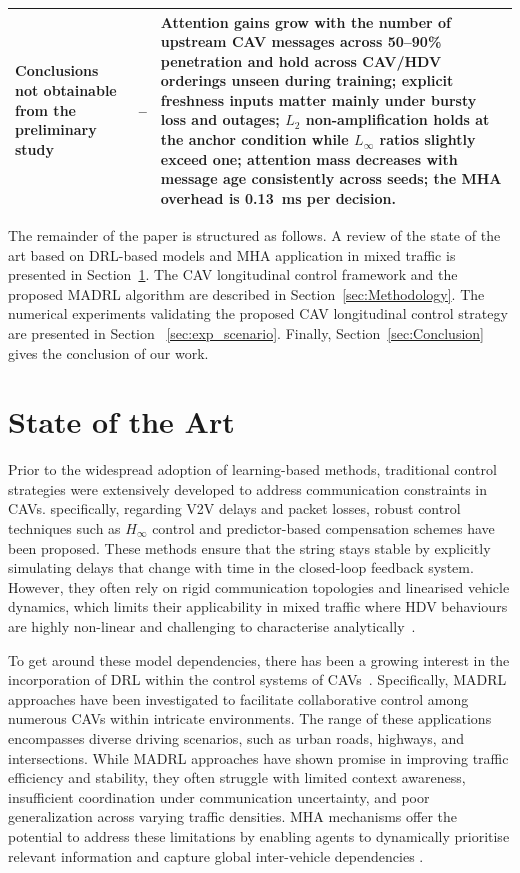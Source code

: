 \documentclass{ieeeaccess}
\begin{document}
\begin{table}[htbp]
\begin{tabularx}{\textwidth}{|p{3.1cm}|X|X|}
\rowcolor{yellow}Conclusions not obtainable from the preliminary study & -- & Attention gains grow with the number of upstream CAV messages across 50--90\% penetration and hold across CAV/HDV orderings unseen during training; explicit freshness inputs matter mainly under bursty loss and outages; $L_2$ non-amplification holds at the anchor condition while $L_\infty$ ratios slightly exceed one; attention mass decreases with message age consistently across seeds; the MHA overhead is 0.13~ms per decision. \\ \hline %
\end{tabularx}
\end{table}



The remainder of the paper is structured as follows. A review of the state of the art based on DRL-based models and MHA application in mixed traffic is presented in Section~\ref{sec:STA}. The CAV longitudinal control framework and the proposed MADRL algorithm are described in Section~\ref{sec:Methodology}. The numerical experiments validating the proposed CAV longitudinal control strategy are presented in Section ~\ref{sec:exp_scenario}. Finally, Section~\ref{sec:Conclusion} gives the conclusion of our work.

\section{State of the Art}
\label{sec:STA}

Prior to the widespread adoption of learning-based methods, traditional control strategies were extensively developed to address communication constraints in CAVs. specifically, regarding V2V delays and packet losses, robust control techniques such as $H_\infty$ control \cite{YANG2025103212} and predictor-based compensation schemes \cite{WEI201796} have been proposed. These methods ensure that the string stays stable by explicitly simulating delays that change with time in the closed-loop feedback system. However, they often rely on rigid communication topologies and linearised vehicle dynamics, which limits their applicability in mixed traffic where HDV behaviours are highly non-linear and challenging to characterise analytically~\cite{findeisen2002introduction, Li2019}.

To get around these model dependencies, there has been a growing interest in the incorporation of DRL within the control systems of CAVs~\cite{Kiran2022_Survey, 11152633}.  Specifically, MADRL approaches have been investigated to facilitate collaborative control among numerous CAVs within intricate environments. The range of these applications encompasses diverse driving scenarios, such as urban roads, highways, and intersections.  While MADRL approaches have shown promise in improving traffic efficiency and stability, they often struggle with limited context awareness, insufficient coordination under communication uncertainty, and poor generalization across varying traffic densities. MHA mechanisms offer the potential to address these limitations by enabling agents to dynamically prioritise relevant information and capture global inter-vehicle dependencies \cite{wang2024hypergraph}.
\end{document}
